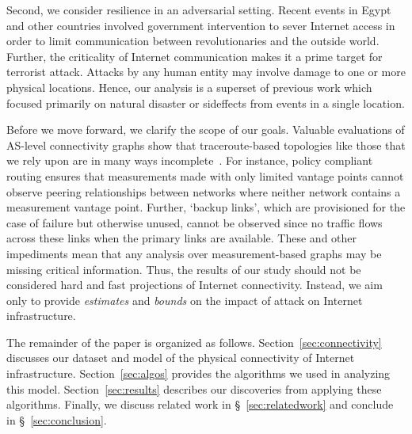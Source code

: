 Second, we consider resilience in an adversarial setting.  Recent events in
Egypt~\cite{thenews} and other countries involved government intervention to
sever Internet access in order to limit communication between revolutionaries
and the outside world.  Further, the criticality of Internet communication
makes it a prime target for terrorist attack.  Attacks by any human entity may
involve damage to one or more physical locations.  Hence, our analysis is a
superset of previous work which focused primarily on natural disaster or
sideffects from events in a single location.

Before we move forward, we clarify the scope of our goals.  Valuable
evaluations of AS-level connectivity graphs show that traceroute-based
topologies like those that we rely upon are in many ways
incomplete~\cite{walter}.  For instance, policy compliant routing ensures that
measurements made with only limited vantage points cannot observe peering
relationships between networks where neither network contains a measurement
vantage point.  Further, `backup links', which are provisioned for the case of
failure but otherwise unused, cannot be observed since no traffic flows across
these links when the primary links are available.  These and other impediments
mean that any analysis over measurement-based graphs may be missing critical
information.  Thus, the results of our study should not be considered hard and
fast projections of Internet connectivity.  Instead, we aim only to provide
{\it estimates} and {\it bounds} on the impact of attack on Internet
infrastructure.

The remainder of the paper is organized as follows.
Section~\ref{sec:connectivity} discusses our dataset and model of the physical
connectivity of Internet infrastructure.  Section~\ref{sec:algos} provides the
algorithms we used in analyzing this model.  Section~\ref{sec:results}
describes our discoveries from applying these algorithms.  Finally, we discuss
related work in \S~\ref{sec:relatedwork} and conclude in
\S~\ref{sec:conclusion}.


